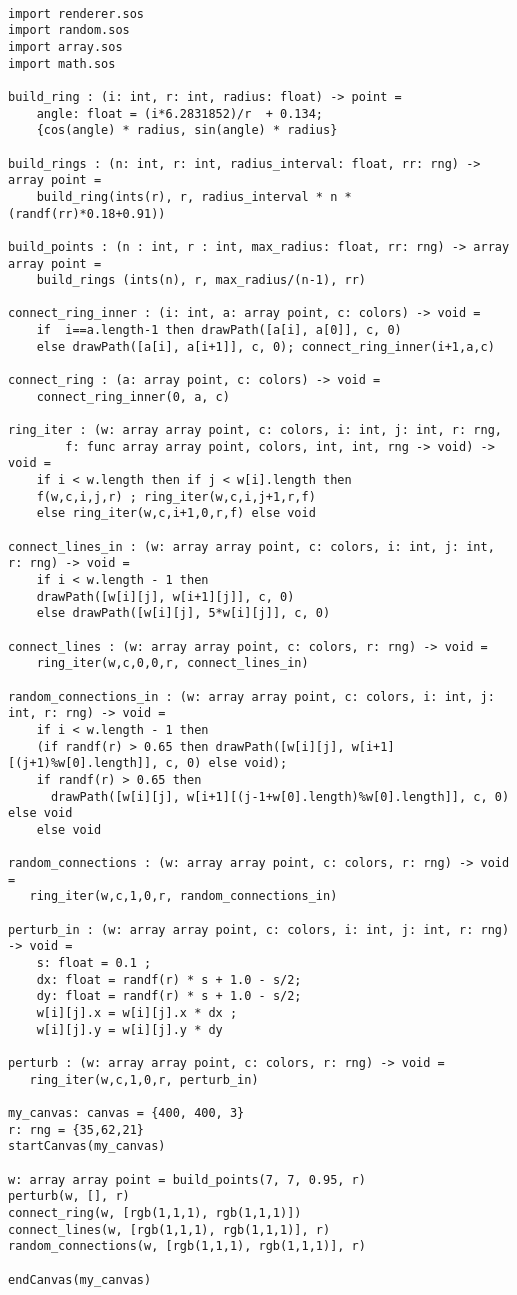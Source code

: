 \documentclass[main.tex]{subfiles}
\begin{document}
\begin{lstlisting}

import renderer.sos
import random.sos
import array.sos
import math.sos

build_ring : (i: int, r: int, radius: float) -> point = 
    angle: float = (i*6.2831852)/r  + 0.134;
    {cos(angle) * radius, sin(angle) * radius}

build_rings : (n: int, r: int, radius_interval: float, rr: rng) -> array point =
    build_ring(ints(r), r, radius_interval * n * (randf(rr)*0.18+0.91))

build_points : (n : int, r : int, max_radius: float, rr: rng) -> array array point = 
    build_rings (ints(n), r, max_radius/(n-1), rr) 

connect_ring_inner : (i: int, a: array point, c: colors) -> void =
    if  i==a.length-1 then drawPath([a[i], a[0]], c, 0)
    else drawPath([a[i], a[i+1]], c, 0); connect_ring_inner(i+1,a,c)

connect_ring : (a: array point, c: colors) -> void =
    connect_ring_inner(0, a, c) 

ring_iter : (w: array array point, c: colors, i: int, j: int, r: rng,
        f: func array array point, colors, int, int, rng -> void) -> void = 
    if i < w.length then if j < w[i].length then
    f(w,c,i,j,r) ; ring_iter(w,c,i,j+1,r,f)
    else ring_iter(w,c,i+1,0,r,f) else void

connect_lines_in : (w: array array point, c: colors, i: int, j: int, r: rng) -> void = 
    if i < w.length - 1 then
    drawPath([w[i][j], w[i+1][j]], c, 0)
    else drawPath([w[i][j], 5*w[i][j]], c, 0)

connect_lines : (w: array array point, c: colors, r: rng) -> void = 
    ring_iter(w,c,0,0,r, connect_lines_in)

random_connections_in : (w: array array point, c: colors, i: int, j: int, r: rng) -> void =
    if i < w.length - 1 then
    (if randf(r) > 0.65 then drawPath([w[i][j], w[i+1][(j+1)%w[0].length]], c, 0) else void); 
    if randf(r) > 0.65 then
      drawPath([w[i][j], w[i+1][(j-1+w[0].length)%w[0].length]], c, 0) else void
    else void

random_connections : (w: array array point, c: colors, r: rng) -> void = 
   ring_iter(w,c,1,0,r, random_connections_in)

perturb_in : (w: array array point, c: colors, i: int, j: int, r: rng) -> void =
    s: float = 0.1 ;
    dx: float = randf(r) * s + 1.0 - s/2;
    dy: float = randf(r) * s + 1.0 - s/2;
    w[i][j].x = w[i][j].x * dx ;
    w[i][j].y = w[i][j].y * dy

perturb : (w: array array point, c: colors, r: rng) -> void = 
   ring_iter(w,c,1,0,r, perturb_in)

my_canvas: canvas = {400, 400, 3}
r: rng = {35,62,21}
startCanvas(my_canvas)

w: array array point = build_points(7, 7, 0.95, r)
perturb(w, [], r)
connect_ring(w, [rgb(1,1,1), rgb(1,1,1)])
connect_lines(w, [rgb(1,1,1), rgb(1,1,1)], r)
random_connections(w, [rgb(1,1,1), rgb(1,1,1)], r)

endCanvas(my_canvas)
\end{lstlisting}
\end{document}
